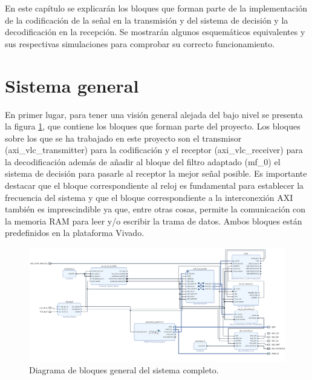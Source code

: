 
\label{chp:App2}
\minitoc

En este capítulo se explicarán los bloques que forman parte de la implementación de
la codificación de la señal en la transmisión y del sistema de decisión y la 
decodificación en la recepción. Se mostrarán algunos esquemáticos equivalentes y 
sus respectivas simulaciones para comprobar su correcto funcionamiento.

\section{Sistema general}
En primer lugar, para tener una visión general alejada del bajo nivel se presenta la 
figura \ref{general}, que contiene los bloques que forman parte del proyecto. Los bloques sobre 
los que se ha trabajado en este proyecto son el transmisor (axi\_vlc\_transmitter) para
la codificación y el receptor (axi\_vlc\_receiver) para la decodificación además de añadir
al bloque del filtro adaptado (mf\_0) el sistema de decisión para pasarle al receptor
la mejor señal posible. Es importante destacar que el bloque correspondiente al reloj es 
fundamental para establecer la frecuencia del sistema y que el bloque correspondiente a la 
interconexión AXI también es imprescindible ya que, entre otras cosas, permite la 
comunicación con la memoria RAM para leer y/o escribir la trama de datos. Ambos bloques
están predefinidos en la plataforma Vivado.

\begin{figure}[ht]
    \centering
    \includegraphics[scale=0.5]{./figuras/general.png}
    \caption{\small{Diagrama de bloques general del sistema completo.}}
    \label{general}%
\end{figure}

